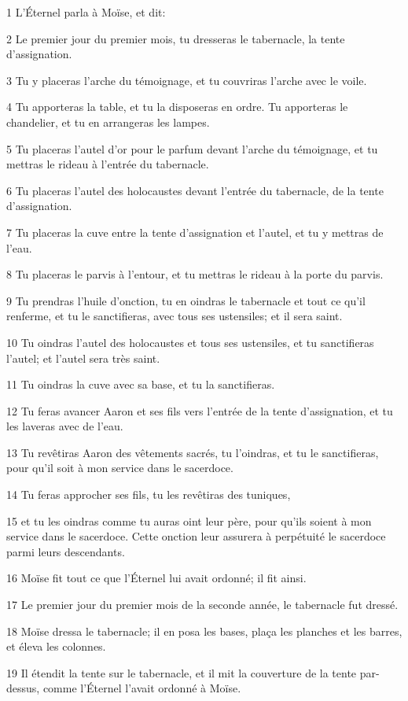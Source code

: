 \par 1 L'Éternel parla à Moïse, et dit:
\par 2 Le premier jour du premier mois, tu dresseras le tabernacle, la tente d'assignation.
\par 3 Tu y placeras l'arche du témoignage, et tu couvriras l'arche avec le voile.
\par 4 Tu apporteras la table, et tu la disposeras en ordre. Tu apporteras le chandelier, et tu en arrangeras les lampes.
\par 5 Tu placeras l'autel d'or pour le parfum devant l'arche du témoignage, et tu mettras le rideau à l'entrée du tabernacle.
\par 6 Tu placeras l'autel des holocaustes devant l'entrée du tabernacle, de la tente d'assignation.
\par 7 Tu placeras la cuve entre la tente d'assignation et l'autel, et tu y mettras de l'eau.
\par 8 Tu placeras le parvis à l'entour, et tu mettras le rideau à la porte du parvis.
\par 9 Tu prendras l'huile d'onction, tu en oindras le tabernacle et tout ce qu'il renferme, et tu le sanctifieras, avec tous ses ustensiles; et il sera saint.
\par 10 Tu oindras l'autel des holocaustes et tous ses ustensiles, et tu sanctifieras l'autel; et l'autel sera très saint.
\par 11 Tu oindras la cuve avec sa base, et tu la sanctifieras.
\par 12 Tu feras avancer Aaron et ses fils vers l'entrée de la tente d'assignation, et tu les laveras avec de l'eau.
\par 13 Tu revêtiras Aaron des vêtements sacrés, tu l'oindras, et tu le sanctifieras, pour qu'il soit à mon service dans le sacerdoce.
\par 14 Tu feras approcher ses fils, tu les revêtiras des tuniques,
\par 15 et tu les oindras comme tu auras oint leur père, pour qu'ils soient à mon service dans le sacerdoce. Cette onction leur assurera à perpétuité le sacerdoce parmi leurs descendants.
\par 16 Moïse fit tout ce que l'Éternel lui avait ordonné; il fit ainsi.
\par 17 Le premier jour du premier mois de la seconde année, le tabernacle fut dressé.
\par 18 Moïse dressa le tabernacle; il en posa les bases, plaça les planches et les barres, et éleva les colonnes.
\par 19 Il étendit la tente sur le tabernacle, et il mit la couverture de la tente par-dessus, comme l'Éternel l'avait ordonné à Moïse.
